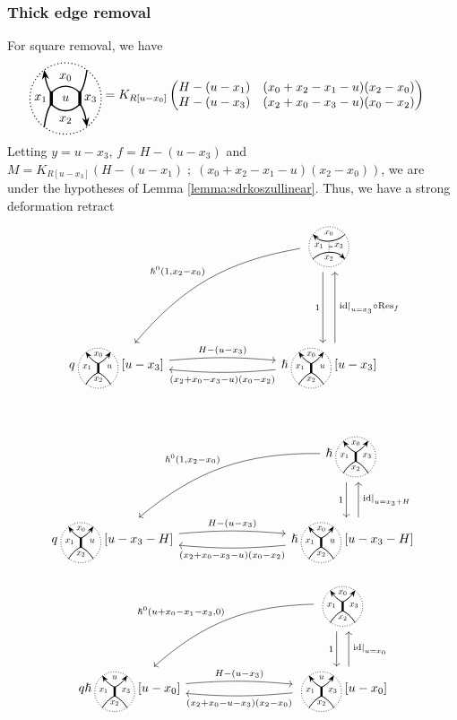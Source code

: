 \documentclass{article}
\newcommand{\id}{\mathrm{id}}
\renewcommand{\sc}{\; ; \;}
\DeclareMathOperator{\Res}{Res}
\theoremstyle{plain} %
\theoremstyle{definition} %
\theoremstyle{remark} %
\begin{document}
\subsubsection{Thick edge removal}
For square removal, we have
\begin{align*}
\SquareStandard{u} &= K_{R[u-x_0]}
    \begin{pmatrix}
    H-(u-x_1) & (x_0+x_2-x_1-u)(x_2-x_0)\\
    H-(u-x_3) & (x_2+x_0-x_3-u)(x_0-x_2)
    \end{pmatrix}
\end{align*}
Letting $y=u-x_3$, $f=H-(u-x_3)$ and $M=K_{R[u-x_3]}(H-(u-x_1)\sc (x_0+x_2-x_1-u)(x_2-x_0))$, we are under the hypotheses of Lemma \ref{lemma:sdrkoszullinear}. Thus, we have a strong deformation retract
\[
\begin{tikzcd}[column sep=3cm, row sep=2cm]
    &\scalebox{0.7}{\UnorientedVerticalThinEdgeStandard} \arrow[d, shift right=2, "{1}", swap] \arrow[dl, bend right=20, "{\hslash^0(1,x_2-x_0)}",swap] 
    \\   q\scalebox{0.7}{\ThickEdge{x_0}{x_1}{x_2}{u}}[u-x_3] \arrow[r, " H-(u-x_3)", bend left=5]& \hslash\scalebox{0.7}{\ThickEdge{x_0}{x_1}{x_2}{u}}[u-x_3] \arrow[l, "(x_2+x_0-x_3-u)(x_0-x_2)", bend left=5]\arrow[u, shift right=2, "{\left.\id\right|_{u=x_3}\circ\Res_{f}}",swap]
\end{tikzcd}
\]

\
\[
\begin{tikzcd}[column sep=3cm, row sep=1cm]
    & \hslash\scalebox{0.7}{\ThickEdgeStandard} \arrow[d, shift right=2, "1", swap] \arrow[dl, bend right=20, "{\hslash^0(1,x_2-x_0)}", swap] 
    \\q\scalebox{0.7}{\ThickEdge{x_0}{x_1}{x_2}{u}}[u-x_3-H] \arrow[r, "H-(u-x_3)", bend left=5]
    & \hslash\scalebox{0.7}{\ThickEdge{x_0}{x_1}{x_2}{u}}[u-x_3-H] \arrow[l, "(x_2+x_0-x_3-u)(x_0-x_2)", bend left=5]\arrow[u, shift right=2, "{\left.\id\right|_{u=x_3+H}}",swap]
\end{tikzcd}
\]


\[
\begin{tikzcd}[column sep=3cm, row sep=1cm]
    & \scalebox{0.7}{\ThickEdgeStandard} \arrow[d, shift right=2, "1", swap] \arrow[dl, bend right=20, "{\hslash^0(u+x_0-x_1-x_3,0)}", swap] \\
    q\hslash \scalebox{0.7}{\ThickEdge{u}{x_1}{x_2}{x_3}}[u-x_0] \arrow[r, "H-(u-x_3)", bend left=5]& \scalebox{0.7}{\ThickEdge{u}{x_1}{x_2}{x_3}}[u-x_0] \arrow[l, "(x_2+x_0-u-x_3)(x_2-x_0)", bend left=5]\arrow[u, shift right=2, "{\left.\id\right|_{u=x_0}}",swap]
\end{tikzcd}
\]
\end{document}
